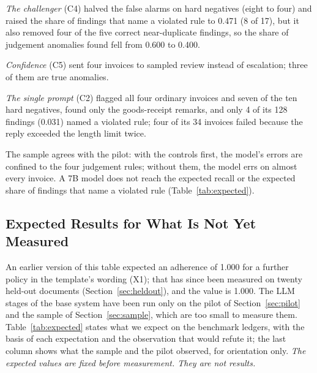 \documentclass[conference]{IEEEtran}
\begin{document}
\textit{The challenger} (C4) halved the false alarms on hard negatives (eight to four) and raised the share of findings that name a violated rule to 0.471 (8 of 17), but it also removed four of the five correct near-duplicate findings, so the share of judgement anomalies found fell from 0.600 to 0.400.

\textit{Confidence} (C5) sent four invoices to sampled review instead of escalation; three of them are true anomalies.

\textit{The single prompt} (C2) flagged all four ordinary invoices and seven of the ten hard negatives, found only the goods-receipt remarks, and only 4 of its 128 findings (0.031) named a violated rule; four of its 34 invoices failed because the reply exceeded the length limit twice.

The sample agrees with the pilot: with the controls first, the model's errors are confined to the four judgement rules; without them, the model errs on almost every invoice. A 7B model does not reach the expected recall or the expected share of findings that name a violated rule (Table~\ref{tab:expected}).

\subsection{Expected Results for What Is Not Yet Measured}
\label{sec:expected}
An earlier version of this table expected an adherence of 1.000 for a further policy in the template's wording (X1); that has since been measured on twenty held-out documents (Section~\ref{sec:heldout}), and the value is 1.000. The LLM stages of the base system have been run only on the pilot of Section~\ref{sec:pilot} and the sample of Section~\ref{sec:sample}, which are too small to measure them. Table~\ref{tab:expected} states what we expect on the benchmark ledgers, with the basis of each expectation and the observation that would refute it; the last column shows what the sample and the pilot observed, for orientation only. \emph{The expected values are fixed before measurement. They are not results.}
\end{document}
